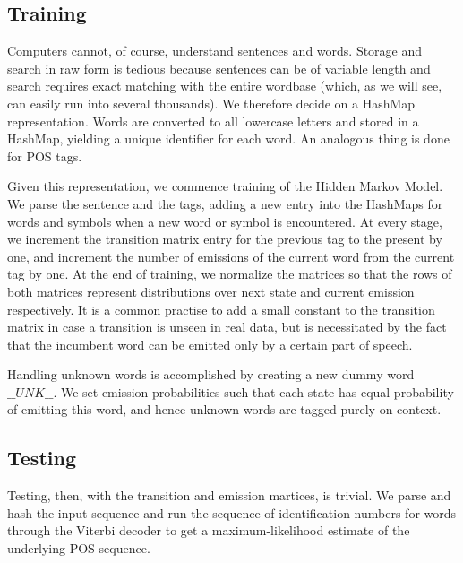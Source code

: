 \documentclass[11pt]{article}
\begin{document}
\subsection{Training}
Computers cannot, of course, understand sentences and words. Storage and search in raw form is tedious because sentences can be of variable length and search requires exact matching with the entire wordbase (which, as we will see, can easily run into several thousands). We therefore decide on a HashMap representation. Words are converted to all lowercase letters and stored in a HashMap, yielding a unique identifier for each word. An analogous thing is done for POS tags.

Given this representation, we commence training of the Hidden Markov Model. We parse the sentence and the tags, adding a new entry into the HashMaps for words and symbols when a new word or symbol is encountered. At every stage, we increment the transition matrix entry for the previous tag to the present by one, and increment the number of emissions of the current word from the current tag by one. At the end of training, we normalize the matrices so that the rows of both matrices represent distributions over next state and current emission respectively. It is a common practise to add a small constant to the transition matrix in case a transition is unseen in real data, but is necessitated by the fact that the incumbent word can be emitted only by a certain part of speech.

Handling unknown words is accomplished by creating a new dummy word $\_\_ UNK \_\_$. We set emission probabilities such that each state has equal probability of emitting this word, and hence unknown words are tagged purely on context.

\subsection{Testing}
Testing, then, with the transition and emission martices, is trivial. We parse and hash the input sequence and run the sequence of identification numbers for words through the Viterbi decoder to get a maximum-likelihood estimate of the underlying POS sequence.
\end{document}

